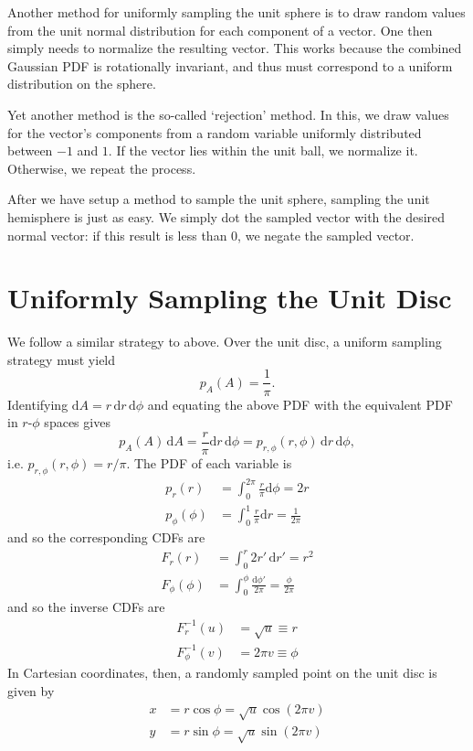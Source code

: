 \documentclass{article}
\begin{document}
Another method for uniformly sampling the unit sphere is to draw random values from the unit normal distribution for each component of a vector. One then simply needs to normalize the resulting vector. This works because the combined Gaussian PDF is rotationally invariant, and thus must correspond to a uniform distribution on the sphere.

Yet another method is the so-called `rejection' method. In this, we draw values for the vector's components from a random variable uniformly distributed between $-1$ and $1$. If the vector lies within the unit ball, we normalize it. Otherwise, we repeat the process.

After we have setup a method to sample the unit sphere, sampling the unit hemisphere is just as easy. We simply dot the sampled vector with the desired normal vector: if this result is less than $0$, we negate the sampled vector.

\section*{Uniformly Sampling the Unit Disc}

We follow a similar strategy to above. Over the unit disc, a uniform sampling strategy must yield
\[
	p_A(A) = \frac{1}{\pi}.
\]
Identifying $\mathrm{d}A = r\,\mathrm{d}r\,\mathrm{d}\phi$ and equating the above PDF with the equivalent PDF in $r$-$\phi$ spaces gives
\[
	p_A(A)\,\mathrm{d}A = \frac{r}{\pi}\mathrm{d}r\,\mathrm{d}\phi = p_{r,\phi}(r, \phi)\,\mathrm{d}r\,\mathrm{d}\phi,
\]
i.e. $p_{r,\phi}(r,\phi) = r/\pi$. The PDF of each variable is
\begin{align*}
	p_r(r) &= \int_0^{2\pi}\frac{r}{\pi}\mathrm{d}\phi = 2r \\
	p_\phi(\phi) &= \int_0^1\frac{r}{\pi}\mathrm{d}r = \frac{1}{2\pi}
\end{align*}
and so the corresponding CDFs are
\begin{align*}
	F_r(r) &= \int_0^r 2r'\,\mathrm{d}r' = r^2 \\
	F_\phi(\phi) &= \int_0^{\phi}\frac{\mathrm{d}\phi'}{2\pi} = \frac{\phi}{2\pi}
\end{align*}
and so the inverse CDFs are
\begin{align*}
	F_r^{-1}(u) &= \sqrt{u} \equiv r \\
	F_\phi^{-1}(v) &= 2\pi{v} \equiv \phi
\end{align*}
In Cartesian coordinates, then, a randomly sampled point on the unit disc is given by
\begin{align*}
	x &= r\cos\phi = \sqrt{u}\cos(2\pi v) \\
	y &= r\sin\phi = \sqrt{u}\sin(2\pi v)
\end{align*}
\end{document}
